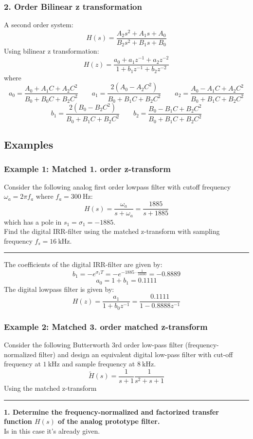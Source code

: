 \subsubsection{2. Order Bilinear z transformation}
A second order system:
$$H(s)={\frac{A_{2}s^{2}+A_{1}s+A_{0}}{B_{2}s^{2}+B_{1}s+B_{0}}}$$
Using bilinear z transformation:
$$H(z)={\frac{a_{0}+a_{1}z^{-1}+a_{2}z^{-2}}{1+b_{1}z^{-1}+b_{2}z^{-2}}}$$
where
$$a_{0}=\frac{A_{0}+A_{1}C+A_{2}C^{2}}{B_{0}+B_{0}C+B_{2}C^{2}}\qquad a_{1}=\frac{2(A_{0}-A_{2}C^{2})}{B_{0}+B_{1}C+B_{2}C^{2}}\qquad a_{2}=\frac{A_{0}-A_{1}C+A_{2}C^{2}}{B_{0}+B_{1}C+B_{2}C^{2}}$$
$$b_{1}=\frac{2(B_{0}-B_{2}C^{2})}{B_{0}+B_{1}C+B_{2}C^{2}}\qquad b_{2}=\frac{B_{0}-B_{1}C+B_{2}C^{2}}{B_{0}+B_{1}C+B_{2}C^{2}}$$
\subsection{Examples}
\subsubsection{Example 1: Matched 1. order z-transform}
Consider the following analog first order lowpass filter with cutoff frequency $\omega_a=2\pi f_a$ where $f_a=\SI{300}{\hertz}$:
$$H(s)=\frac{\omega_a}{s+\omega_a}=\frac{1885}{s+1885}$$
which has a pole in $s_1=\sigma_1=-1885$.\\
Find the digital IRR-filter using the matched z-transform with sampling frequency $f_s=\SI{16}{\kilo\hertz}$.

\noindent\rule{\textwidth}{1pt}

The coefficients of the digital IRR-filter are given by:
$$b_1=-e^{\sigma_1 T}=-e^{-1885\cdot\frac{1}{16000}}=-0.8889$$
$$a_0=1+b_1=0.1111$$
The digital lowpass filter is given by:
$$H(z)=\frac{a_1}{1+b_0z^{-1}}=\frac{0.1111}{1-0.8888z^{-1}}$$

\subsubsection{Example 2: Matched 3. order matched z-transform}
Consider the following Butterworth 3rd order low-pass filter (frequency-normalized filter) 
and design an equivalent digital low-pass filter with cut-off frequency at $\SI{1}{\kilo\hertz}$ and sample frequency at $\SI{8}{\kilo\hertz}$. 
$${\tilde{H}}(s)=\frac{1}{s+1}\frac{1}{s^{2}+s+1}$$
Using the matched z-transform

\noindent\rule{\textwidth}{1pt}

\textbf{1. Determine the frequency-normalized and factorized transfer function $H(s)$ of the analog prototype filter.}\\
Is in this case it's already given.

